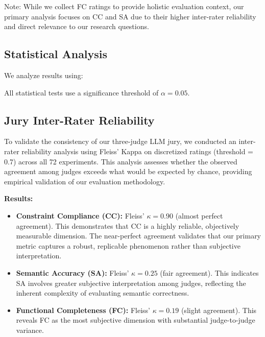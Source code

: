 \documentclass[11pt]{article}
\begin{document}
Note: While we collect FC ratings to provide holistic evaluation context, our primary analysis focuses on CC and SA due to their higher inter-rater reliability and direct relevance to our research questions.

\subsection{Statistical Analysis}

We analyze results using:

All statistical tests use a significance threshold of $\alpha = 0.05$.

\subsection{Jury Inter-Rater Reliability}

To validate the consistency of our three-judge LLM jury, we conducted an inter-rater reliability analysis using Fleiss' Kappa on discretized ratings (threshold = 0.7) across all 72 experiments. This analysis assesses whether the observed agreement among judges exceeds what would be expected by chance, providing empirical validation of our evaluation methodology.

\textbf{Results:}
\begin{itemize}
\item \textbf{Constraint Compliance (CC):} Fleiss' $\kappa = 0.90$ (almost perfect agreement). This demonstrates that CC is a highly reliable, objectively measurable dimension. The near-perfect agreement validates that our primary metric captures a robust, replicable phenomenon rather than subjective interpretation.
\item \textbf{Semantic Accuracy (SA):} Fleiss' $\kappa = 0.25$ (fair agreement). This indicates SA involves greater subjective interpretation among judges, reflecting the inherent complexity of evaluating semantic correctness.
\item \textbf{Functional Completeness (FC):} Fleiss' $\kappa = 0.19$ (slight agreement). This reveals FC as the most subjective dimension with substantial judge-to-judge variance.
\end{itemize}
\end{document}
